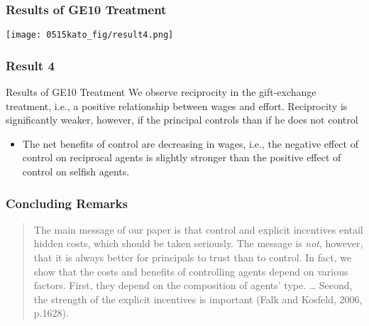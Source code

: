\documentclass[unicode,12pt]{beamer}
\begin{document}
    \begin{frame}
        \frametitle{Results of GE10 Treatment}
    
        \centerline{\texttt{[image: 0515kato\_fig/result4.png]}}
    
    \end{frame}

    \begin{frame}
        \frametitle{Result 4}
    
        \begin{block}{Results of GE10 Treatment}
            We observe reciprocity in the gift-exchange treatment, i.e., a positive relationship between wages and effort. Reciprocity is significantly weaker, however, if the principal controls than if he does not control
        \end{block}
        \begin{itemize}
            \item The net benefits of control are decreasing in wages, i.e., the negative effect of control on reciprocal agents is slightly stronger than the positive effect of control on selfish agents.
        \end{itemize}
    
    \end{frame}

    \begin{frame}
        \frametitle{Concluding Remarks}
    
        \begin{quote}
            The main message of our paper is that control and explicit incentives entail hidden costs,
            which should be taken seriously.
            The message is \textit{not}, however, that it is always better for principals to trust than to control.
            In fact, we show that the costs and benefits of controlling agents depend on various factors.
            First, they depend on the composition of agents' type.
            \dots
            Second, the strength of the explicit incentives is important (Falk and Kosfeld, 2006, p.1628).
        \end{quote}
    
    \end{frame}
\end{document}

